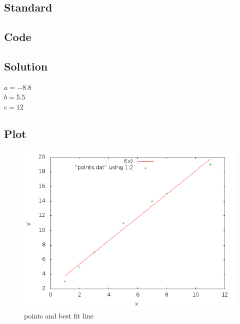 \documentclass[a4paper,10pt]{article}
\begin{document}
	\subsection{Standard}
	

	\subsection{Code}
	

	\subsection{Solution}
	$a=-8.8$\\
	$b=5.5$\\
	$c=12$

	

	\subsection{Plot}
		\begin{figure}[!htb]
			\centering
			\includegraphics[scale=.5]{plot.png}
			\caption{points and best fit line}
			\label{fig:algcomp}
		\end{figure}
\end{document}
